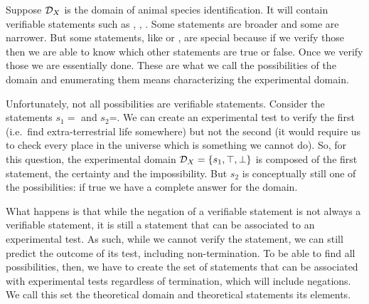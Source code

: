 	Suppose $\mathcal{D}_X$ is the domain of animal species identification. It will contain verifiable statements such as , , . Some statements are broader and some are narrower. But some statements, like  or , are special because if we verify those then we are able to know which other statements are true or false. Once we verify those we are essentially done. These are what we call the possibilities of the domain and enumerating them means characterizing the experimental domain.
	
	Unfortunately, not all possibilities are verifiable statements. Consider the statements $s_1=$ and $s_2$=. We can create an experimental test to verify the first (i.e.~find extra-terrestrial life somewhere) but not the second (it would require us to check every place in the universe which is something we cannot do). So, for this question, the experimental domain $\mathcal{D}_X = \{s_1, \top, \bot\}$ is composed of the first statement, the certainty and the impossibility. But $s_2$ is conceptually still one of the possibilities: if true we have a complete answer for the domain.
	
	What happens is that while the negation of a verifiable statement is not always a verifiable statement, it is still a statement that can be associated to an experimental test. As such, while we cannot verify the statement, we can still predict the outcome of its test, including non-termination. To be able to find all possibilities, then, we have to create the set of statements that can be associated with experimental tests regardless of termination, which will include negations. We call this set the theoretical domain and theoretical statements its elements.
	
